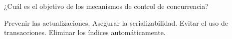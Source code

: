 \question[1] ¿Cuál es el objetivo de los mecanismos de control de concurrencia?
\begin{choices}
\choice Prevenir las actualizaciones.
\CorrectChoice Asegurar la serializabilidad.
\choice Evitar el uso de transacciones.
\choice Eliminar los índices automáticamente.
\end{choices}